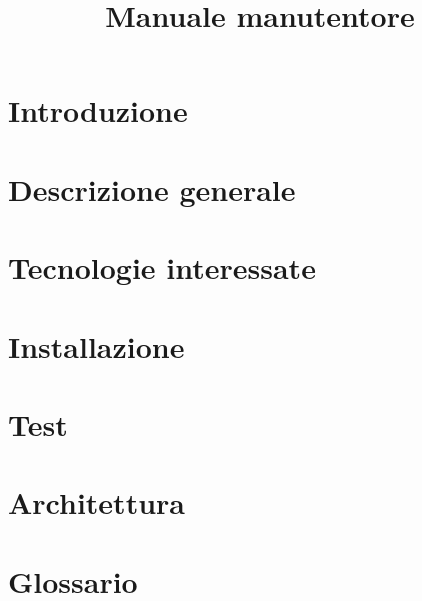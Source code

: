 \documentclass{article}
\title{Manuale manutentore}
\begin{document}


\section{Introduzione}%
\label{sec:introduzione}


\newpage
\section{Descrizione generale}%
\label{sec:descrizione_generale}


\newpage
\section{Tecnologie interessate}%
\label{sec:tecnologie_interessate}


\newpage
\section{Installazione}%
\label{sec:installazione}


\newpage
\section{Test}%
\label{sec:test}


\newpage
\section{Architettura}%
\label{sec:architettura}


% 

\newpage
\appendix
\setcounter{secnumdepth}{1} %
\section{Glossario}%
\label{sec:glossario}

\end{document}
